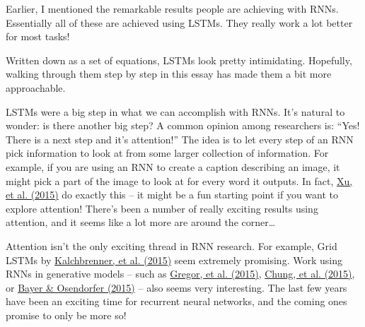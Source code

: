 Earlier, I mentioned the remarkable results people are achieving with RNNs. Essentially all of these are achieved using LSTMs. They really work a lot better for most tasks!

Written down as a set of equations, LSTMs look pretty intimidating. Hopefully, walking through them step by step in this essay has made them a bit more approachable.

LSTMs were a big step in what we can accomplish with RNNs. It’s natural to wonder: is there another big step? A common opinion among researchers is: “Yes! There is a next step and it’s attention!” The idea is to let every step of an RNN pick information to look at from some larger collection of information. For example, if you are using an RNN to create a caption describing an image, it might pick a part of the image to look at for every word it outputs. In fact, \href{http://arxiv.org/pdf/1502.03044v2.pdf}{Xu, et al. (2015)} do exactly this – it might be a fun starting point if you want to explore attention! There’s been a number of really exciting results using attention, and it seems like a lot more are around the corner…

Attention isn’t the only exciting thread in RNN research. For example, Grid LSTMs by \href{http://arxiv.org/pdf/1507.01526v1.pdf}{Kalchbrenner, et al. (2015)} seem extremely promising. Work using RNNs in generative models – such as \href{http://arxiv.org/pdf/1502.04623.pdf}{Gregor, et al. (2015)}, \href{http://arxiv.org/pdf/1506.02216v3.pdf}{Chung, et al. (2015)}, or \href{http://arxiv.org/pdf/1411.7610v3.pdf}{Bayer \& Osendorfer (2015)} – also seems very interesting. The last few years have been an exciting time for recurrent neural networks, and the coming ones promise to only be more so!